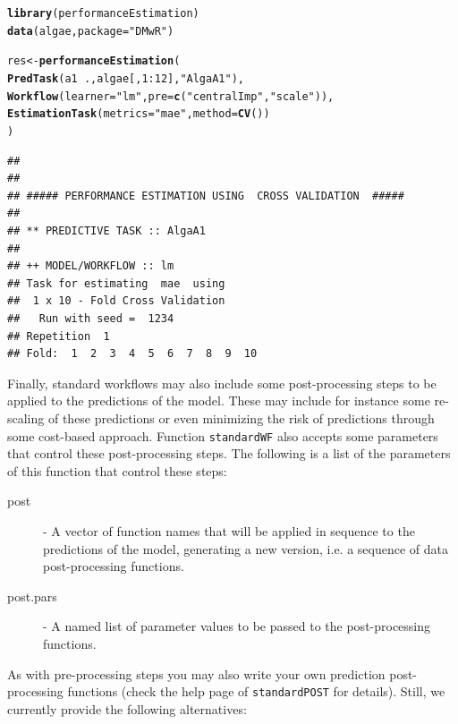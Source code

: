 \documentclass[10pt,a4paper]{article}\usepackage[]{graphicx}\usepackage[]{color}
\makeatletter
\newcommand{\hlnum}[1]{\textcolor[rgb]{0.686,0.059,0.569}{#1}}%
\newcommand{\hlstr}[1]{\textcolor[rgb]{0.192,0.494,0.8}{#1}}%
\newcommand{\hlopt}[1]{\textcolor[rgb]{0,0,0}{#1}}%
\newcommand{\hlstd}[1]{\textcolor[rgb]{0.345,0.345,0.345}{#1}}%
\newcommand{\hlkwb}[1]{\textcolor[rgb]{0.69,0.353,0.396}{#1}}%
\newcommand{\hlkwc}[1]{\textcolor[rgb]{0.333,0.667,0.333}{#1}}%
\newcommand{\hlkwd}[1]{\textcolor[rgb]{0.737,0.353,0.396}{\textbf{#1}}}%
\newenvironment{kframe}{%
 \def\at@end@of@kframe{}%
 \ifinner\ifhmode%
  \def\at@end@of@kframe{\end{minipage}}%
  \begin{minipage}{\columnwidth}%
 \fi\fi%
 \def\FrameCommand##1{\hskip\@totalleftmargin \hskip-\fboxsep
 \colorbox{shadecolor}{##1}\hskip-\fboxsep
     \hskip-\linewidth \hskip-\@totalleftmargin \hskip\columnwidth}%
 \MakeFramed {\advance\hsize-\width
   \@totalleftmargin\z@ \linewidth\hsize
   \@setminipage}}%
 {\par\unskip\endMakeFramed%
 \at@end@of@kframe}
\newenvironment{knitrout}{}{} %
\makeatother
\begin{document}
\begin{knitrout}\footnotesize
{}\color{fgcolor}\begin{kframe}
\begin{alltt}
\hlkwd{library}\hlstd{(performanceEstimation)}
\hlkwd{data}\hlstd{(algae,}\hlkwc{package}\hlstd{=}\hlstr{"DMwR"}\hlstd{)}

\hlstd{res} \hlkwb{<-} \hlkwd{performanceEstimation}\hlstd{(}
         \hlkwd{PredTask}\hlstd{(a1} \hlopt{~} \hlstd{.,algae[,}\hlnum{1}\hlopt{:}\hlnum{12}\hlstd{],}\hlstr{"AlgaA1"}\hlstd{),}
         \hlkwd{Workflow}\hlstd{(}\hlkwc{learner}\hlstd{=}\hlstr{"lm"}\hlstd{,}\hlkwc{pre}\hlstd{=}\hlkwd{c}\hlstd{(}\hlstr{"centralImp"}\hlstd{,}\hlstr{"scale"}\hlstd{)),}
         \hlkwd{EstimationTask}\hlstd{(}\hlkwc{metrics}\hlstd{=}\hlstr{"mae"}\hlstd{,}\hlkwc{method}\hlstd{=}\hlkwd{CV}\hlstd{())}
         \hlstd{)}
\end{alltt}
\begin{verbatim}
## 
## 
## ##### PERFORMANCE ESTIMATION USING  CROSS VALIDATION  #####
## 
## ** PREDICTIVE TASK :: AlgaA1
## 
## ++ MODEL/WORKFLOW :: lm 
## Task for estimating  mae  using
##  1 x 10 - Fold Cross Validation
## 	 Run with seed =  1234 
## Repetition  1 
## Fold:  1  2  3  4  5  6  7  8  9  10
\end{verbatim}
\end{kframe}
\end{knitrout}

Finally, standard workflows may also include some post-processing steps to be applied to the predictions of the model. These may include for instance some re-scaling of these predictions or even minimizing the risk of predictions through some cost-based approach. Function \texttt{standardWF} also accepts some parameters that control these post-processing steps. The following is a list of the parameters of this function that control these steps:

\begin{description}
\item[post] - A vector of function names that will be applied in sequence to the
  predictions of the model, generating a new version, i.e. a sequence of data
  post-processing functions.

\item[post.pars] - A named list of parameter values to be passed to the post-processing functions.
\end{description}

As with pre-processing steps you may also write your own prediction post-processing functions (check the help page of \texttt{standardPOST} for details). Still, we currently provide the following alternatives:
\end{document}
